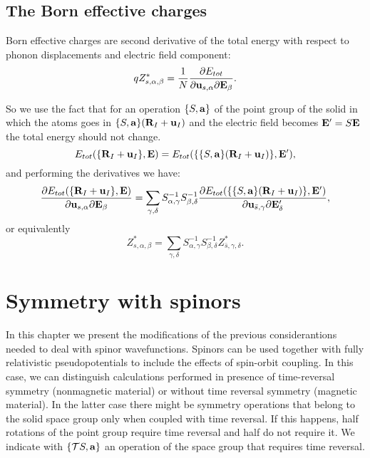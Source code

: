 \documentclass[12pt,a4paper,twoside]{report}
\begin{document}
\section{The Born effective charges}
Born effective charges are second derivative of the total energy with respect to phonon displacements and electric field component:
\begin{equation}
qZ^*_{s,\alpha,\beta}= {1\over N} {\partial E_{tot} \over \partial {\bf u}_{s,\alpha} \partial {\bf E}_\beta}.
\end{equation}

So we use the fact that for an operation $\{S,{\bf a}\}$ of the point group of the solid in which the atoms goes in $\{S,{\bf a}\} ({\bf R}_I+{\bf u}_I)$ and the electric field becomes 
${\bf E}'=S{\bf E}$ the total energy should not change.
\begin{equation}
E_{tot}(\{{\bf R}_I+{\bf u}_I\},{\bf E}) =
E_{tot}(\{\{S,{\bf a}\}({\bf R}_I+{\bf u}_I)\},{\bf E}'),
\end{equation}
and performing the derivatives we have:
\begin{equation}
{\partial E_{tot}(\{{\bf R}_I+{\bf u}_I\},{\bf E}) \over  \partial {\bf u}_{s,\alpha} \partial {\bf E}_\beta} = \sum_{\gamma,\delta} S^{-1}_{\alpha,\gamma} S^{-1}_{\beta,\delta} {\partial 
E_{tot}(\{\{S,{\bf a}\}({\bf R}_I+{\bf u}_I)\},{\bf E}')
\over \partial {\bf u}_{\bar s,\gamma} \partial {\bf E}'_\delta},
\end{equation}
or equivalently
\begin{equation}
Z^*_{s,\alpha,\beta}
= \sum_{\gamma,\delta} S^{-1}_{\alpha,\gamma} S^{-1}_{\beta,\delta} 
Z^*_{\bar s,\gamma,\delta}.
\end{equation}

\newpage
{\color{dark-blue}\chapter{Symmetry with spinors}}
In this chapter we present the modifications of the previous considerantions needed to deal with spinor wavefunctions.
Spinors can be used together with fully relativistic pseudopotentials to include the effects of spin-orbit coupling. In this case, we can distinguish calculations performed in presence of time-reversal symmetry (nonmagnetic material) or without time reversal symmetry (magnetic material). In the latter case there might be symmetry operations that belong to the solid space group only when coupled with time reversal. If this happens, half rotations of the point group require time reversal and half do not require it. We indicate with $\{\mathcal{T}S,{\bf a}\}$ an operation of the space group that requires time reversal. 
\end{document}
